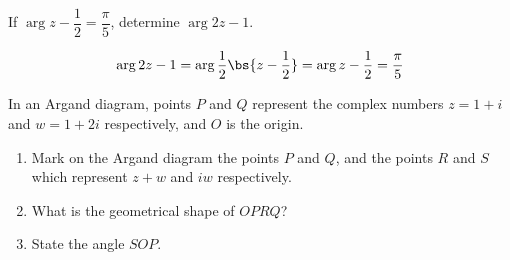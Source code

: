 \documentclass{echw}
\begin{document}
    \problem{}
        If $\arg{z - \dfrac12} = \dfrac\pi5$, determine $\arg{2z - 1}$.

    \solution
        \[
            \arg{2z - 1} = \arg{\dfrac12 \bs{z - \dfrac12}} = \arg{z - \dfrac12} = \dfrac\pi5
        \]



    \problem{}
        In an Argand diagram, points $P$ and $Q$ represent the complex numbers $z = 1 + i$ and $w = 1 + 2i$ respectively, and $O$ is the origin.

        \begin{enumerate}
            \item Mark on the Argand diagram the points $P$ and $Q$, and the points $R$ and $S$ which represent $z + w$ and $iw$ respectively.
            \item What is the geometrical shape of $OPRQ$?
            \item State the angle $SOP$.
        \end{enumerate}

    \solution
\end{document}
